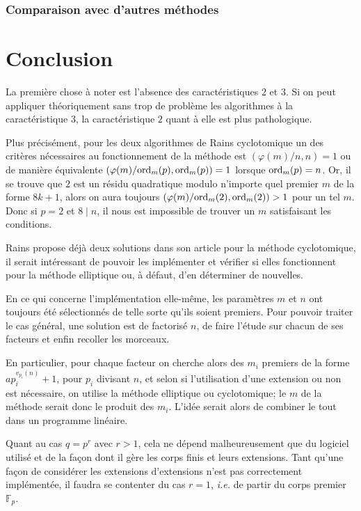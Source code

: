 \documentclass[a4paper]{article} %
\numberwithin{section}{part}
\numberwithin{equation}{section}
\newcommand\GF[1]{\mathbb{F}_{#1}}
\newcommand\ord[2]{\textup{ord}_{#1}(#2)}
\begin{document}
\section{Comparaison avec d'autres méthodes}
%
%
%


\part{Conclusion}
\label{quatre}
La première chose à noter est l'absence des caractéristiques $2$ et $3$. Si on
peut appliquer théoriquement sans trop de problème les algorithmes à la
caractéristique $3$, la caractéristique $2$ quant à elle est plus
pathologique.\par
Plus précisément, pour les deux algorithmes de Rains cyclotomique un des 
critères nécessaires au fonctionnement de la méthode est $(\varphi(m)/n, n) = 1$
ou de manière équivalente $(\varphi(m)/\ord{m}{p},\ord{m}{p}) = 1$
lorsque $\ord{m}{p} = n$. Or, il se trouve que $2$ est un résidu
quadratique modulo n'importe quel premier $m$ de la forme $8k + 1$, alors on
aura toujours $(\varphi(m)/\ord{m}{2},\ord{m}{2}) > 1$ pour un tel
$m$. Donc si $p = 2$ et $8\mid n$, il nous est impossible de trouver un $m$
satisfaisant les conditions.\par
Rains propose déjà deux solutions dans son article pour la méthode cyclotomique,
il serait intéressant de pouvoir les implémenter et vérifier si elles
fonctionnent pour la méthode elliptique ou, à défaut, d'en déterminer de
nouvelles.

\vspace{0.3cm}

En ce qui concerne l'implémentation elle-même, les paramètres $m$ et $n$ ont 
toujours été sélectionnés de telle sorte qu'ils soient premiers. Pour pouvoir 
traiter le cas général, une solution est de factorisé $n$, de faire l'étude sur 
chacun de ses facteurs et enfin recoller les morceaux.\par
En particulier, pour chaque facteur on cherche alors des $m_i$ premiers de la 
forme $ap_i^{v_{p_i}(n)} + 1$, pour $p_i$ divisant $n$, et selon si 
l'utilisation d'une extension ou non est nécessaire, on utilise la méthode 
elliptique ou cyclotomique; le $m$ de la méthode serait donc le produit des 
$m_i$. L'idée serait alors de combiner le tout dans un programme linéaire.\par
Quant au cas $q = p^r$ avec $r>1$, cela ne dépend malheureusement que du
logiciel utilisé et de la façon dont il gère les corps finis et leurs
extensions. Tant qu'une façon de considérer les extensions d'extensions 
n'est pas correctement implémentée, il faudra se contenter du cas $r = 1$,
\emph{i.e.} de partir du corps premier $\GF{p}$.
\end{document}
